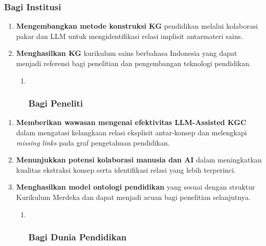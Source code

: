 \documentclass[
]{article}
\begin{document}
\hypertarget{bagi-institusi}{%
\subsubsection{Bagi Institusi}\label{bagi-institusi}}

\begin{enumerate}
\def\labelenumi{\arabic{enumi}.}
\item
  \textbf{Mengembangkan metode konstruksi KG} pendidikan melalui
  kolaborasi pakar dan LLM untuk mengidentifikasi relasi implisit
  antarmateri sains.
\item
  \textbf{Menghasilkan KG} kurikulum sains berbahasa Indonesia yang
  dapat menjadi referensi bagi penelitian dan pengembangan teknologi
  pendidikan.

  \begin{enumerate}
  \def\labelenumii{\arabic{enumii}.}
  \item ~
    \hypertarget{bagi-peneliti}{%
    \subsubsection{Bagi Peneliti}\label{bagi-peneliti}}
  \end{enumerate}
\end{enumerate}

\begin{enumerate}
\def\labelenumi{\arabic{enumi}.}
\item
  \textbf{Memberikan wawasan mengenai efektivitas LLM-Assisted KGC}
  dalam mengatasi kelangkaan relasi eksplisit antar-konsep dan
  melengkapi \emph{missing links} pada graf pengetahuan pendidikan.
\item
  \textbf{Menunjukkan potensi kolaborasi manusia dan AI} dalam
  meningkatkan kualitas ekstraksi konsep serta identifikasi relasi yang
  lebih terperinci.
\item
  \textbf{Menghasilkan model ontologi pendidikan} yang sesuai dengan
  struktur Kurikulum Merdeka dan dapat menjadi acuan bagi penelitian
  selanjutnya.

  \begin{enumerate}
  \def\labelenumii{\arabic{enumii}.}
  \item ~
    \hypertarget{bagi-dunia-pendidikan}{%
    \subsubsection{Bagi Dunia Pendidikan}\label{bagi-dunia-pendidikan}}
  \end{enumerate}
\end{enumerate}
\end{document}
